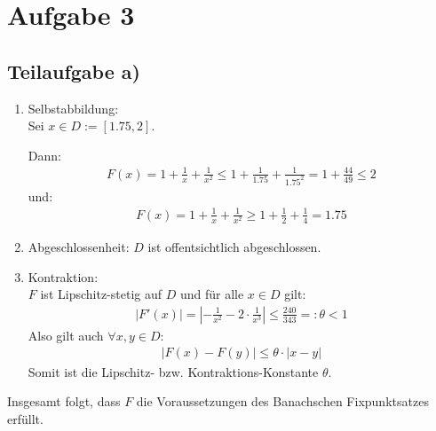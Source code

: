 \section*{Aufgabe 3}
\subsection*{Teilaufgabe a)}

\begin{enumerate}
\item Selbstabbildung: \\
	Sei $x \in D := [1.75 , 2]$.

	Dann:
	\begin{align}
		F(x) = 1 + \frac{1}{x} + \frac{1}{x^2} \le 1 + \frac{1}{1.75} + \frac{1}{1.75^2} = 1 + \frac{44}{49} \le 2
	\end{align}
	und: \\
	\begin{align}
		F(x) = 1 + \frac{1}{x} + \frac{1}{x^2} \ge 1 + \frac{1}{2} + \frac{1}{4} = 1.75
	\end{align}

\item Abgeschlossenheit: $D$ ist offentsichtlich abgeschlossen.
\item Kontraktion: \\
	$F$ ist Lipschitz-stetig auf $D$ und für alle $x \in D$ gilt: \\
	\begin{align}
		|F'(x)| = |-\frac{1}{x^2}-2 \cdot \frac{1}{x^3}| \le \frac{240}{343} =: \theta < 1
	\end{align}
	Also gilt auch $\forall x,y \in D $:
	\begin{align}
		|F(x) - F(y)| \le \theta \cdot |x - y|
	\end{align}
	Somit ist die Lipschitz- bzw. Kontraktions-Konstante $\theta$.
\end{enumerate}
Insgesamt folgt, dass $F$ die Voraussetzungen des Banachschen Fixpunktsatzes erfüllt.
